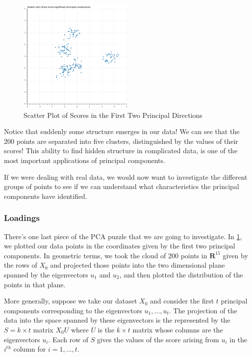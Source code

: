 \documentclass[
]{article}
\begin{document}
\begin{figure}
\hypertarget{fig:principalvalues}{%
\centering
\includegraphics[width=0.5\textwidth,height=\textheight]{../img/pcadimred.png}
\caption{Scatter Plot of Scores in the First Two Principal
Directions}\label{fig:principalvalues}
}
\end{figure}

Notice that suddenly some structure emerges in our data! We can see that
the 200 points are separated into five clusters, distinguished by the
values of their scores! This ability to find hidden structure in
complicated data, is one of the most important applications of principal
components.

If we were dealing with real data, we would now want to investigate the
different groups of points to see if we can understand what
characteristics the principal components have identified.

\hypertarget{loadings}{%
\subsubsection{Loadings}\label{loadings}}

There's one last piece of the PCA puzzle that we are going to
investigate. In \cref{fig:principalvalues}, we plotted our data points
in the coordinates given by the first two principal components. In
geometric terms, we took the cloud of \(200\) points in
\(\mathbf{R}^{15}\) given by the rows of \(X_{0}\) and projected those
points into the two dimensional plane spanned by the eigenvectors
\(u_{1}\) and \(u_{2}\), and then plotted the distribution of the points
in that plane.

More generally, suppose we take our dataset \(X_{0}\) and consider the
first \(t\) principal components corresponding to the eigenvectors
\(u_{1},\ldots, u_{t}\). The projection of the data into the space
spanned by these eigenvectors is the represented by the
\(S = k\times t\) matrix \(X_{0}U\) where \(U\) is the \(k\times t\)
matrix whose columns are the eigenvectors \(u_{i}\). Each row of \(S\)
gives the values of the score arising from \(u_{i}\) in the \(i^{th}\)
column for \(i=1,\ldots, t\).
\end{document}
